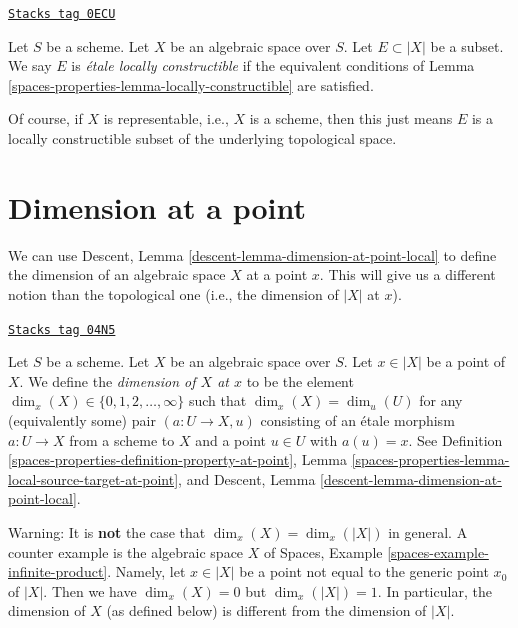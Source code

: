 \begin{definition}
\label{spaces-properties-definition-locally-constructible}
\href{https://stacks.math.columbia.edu/tag/0ECU}{\texttt{Stacks tag 0ECU}}

Let $S$ be a scheme. Let $X$ be an algebraic space over $S$.
Let $E \subset |X|$ be a subset. We say $E$ is
{\it \'etale locally constructible} if the equivalent
conditions of Lemma \ref{spaces-properties-lemma-locally-constructible} are satisfied.
\end{definition}

Of course, if $X$ is representable, i.e., $X$ is a scheme,
then this just means $E$ is a locally constructible subset
of the underlying topological space.

\section{Dimension at a point}
\label{spaces-properties-section-dimension}
We can use
Descent, Lemma \ref{descent-lemma-dimension-at-point-local}
to define the dimension of an algebraic
space $X$ at a point $x$. This will give us a different notion than the
topological one (i.e., the dimension of $|X|$ at $x$).

\begin{definition}
\label{spaces-properties-definition-dimension-at-point}
\href{https://stacks.math.columbia.edu/tag/04N5}{\texttt{Stacks tag 04N5}}

Let $S$ be a scheme.
Let $X$ be an algebraic space over $S$.
Let $x \in |X|$ be a point of $X$.
We define the {\it dimension of $X$ at $x$} to be
the element $\dim_x(X) \in \{0, 1, 2, \ldots, \infty\}$
such that $\dim_x(X) = \dim_u(U)$ for any (equivalently some)
pair $(a : U \to X, u)$ consisting of an \'etale morphism $a : U \to X$
from a scheme to $X$ and a point $u \in U$ with $a(u) = x$.
See
Definition \ref{spaces-properties-definition-property-at-point},
Lemma \ref{spaces-properties-lemma-local-source-target-at-point}, and
Descent, Lemma \ref{descent-lemma-dimension-at-point-local}.
\end{definition}

Warning: It is {\bf not} the case that $\dim_x(X) = \dim_x(|X|)$
in general. A counter example is the algebraic space $X$ of
Spaces, Example \ref{spaces-example-infinite-product}.
Namely, let $x \in |X|$ be a point not equal to the generic point $x_0$
of $|X|$. Then we have $\dim_x(X) = 0$ but $\dim_x(|X|) = 1$.
In particular, the dimension of $X$ (as defined
below) is different from the dimension of $|X|$.


